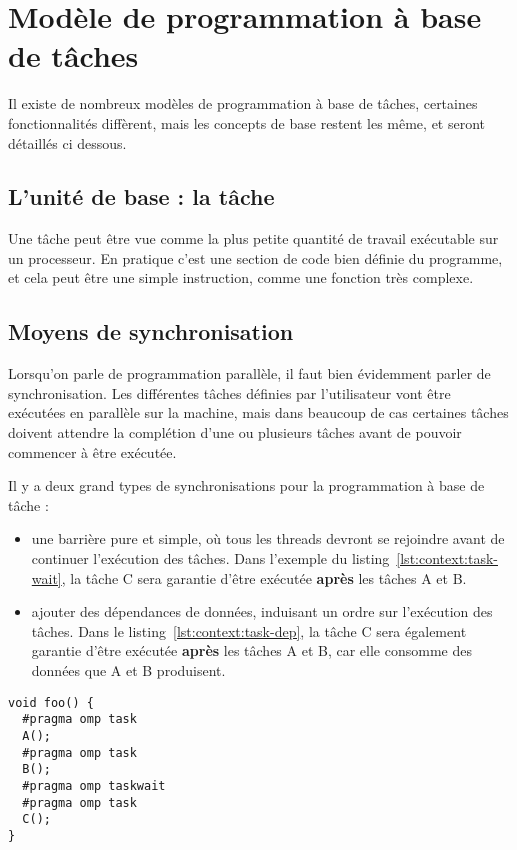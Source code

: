 \section{Modèle de programmation à base de tâches}\label{sec:context:others}

Il existe de nombreux modèles de programmation à base de tâches, certaines fonctionnalités diffèrent, mais les concepts de base restent les même, et seront détaillés ci dessous.

\subsection{L'unité de base : la tâche}

Une tâche peut être vue comme la plus petite quantité de travail exécutable sur un processeur.
En pratique c'est une section de code bien définie du programme, et cela peut être une simple instruction, comme une fonction très complexe.

\subsection{Moyens de synchronisation}

Lorsqu'on parle de programmation parallèle, il faut bien évidemment parler de synchronisation.
Les différentes tâches définies par l'utilisateur vont être exécutées en parallèle sur la machine, mais dans beaucoup de cas certaines tâches doivent attendre la complétion d'une ou plusieurs tâches avant de pouvoir commencer à être exécutée.

Il y a deux grand types de synchronisations pour la programmation à base de tâche :

\begin{itemize}
  \item une barrière pure et simple, où tous les threads devront se rejoindre avant de continuer l'exécution des tâches. Dans l'exemple du listing~\ref{lst:context:task-wait}, la tâche C sera garantie d'être exécutée \textbf{après} les tâches A et B.
  \item ajouter des dépendances de données, induisant un ordre sur l'exécution des tâches. Dans le listing~\ref{lst:context:task-dep}, la tâche C sera également garantie d'être exécutée \textbf{après} les tâches A et B, car elle consomme des données que A et B produisent.
\end{itemize}

\begin{lstlisting}[caption=Synchronisation via une barrière,label=lst:context:task-wait]
void foo() {
  #pragma omp task
  A();
  #pragma omp task
  B();
  #pragma omp taskwait
  #pragma omp task
  C();
}
\end{lstlisting}

